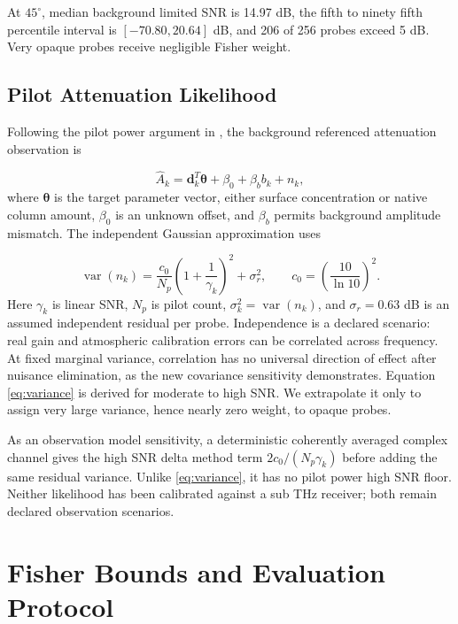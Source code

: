 \documentclass[conference]{IEEEtran}
\begin{document}
At $45^\circ$, median background limited SNR is 14.97 dB, the fifth to ninety fifth percentile interval is $[-70.80,20.64]$ dB, and 206 of 256 probes exceed 5 dB. Very opaque probes receive negligible Fisher weight.

\subsection{Pilot Attenuation Likelihood}

Following the pilot power argument in \cite{dong2026rain}, the background referenced attenuation observation is

\begin{equation}
\widehat{A}_k=\boldsymbol d_k^T\boldsymbol\theta
+\beta_0+\beta_b b_k+n_k,
\label{eq:observation}
\end{equation}
where $\boldsymbol\theta$ is the target parameter vector, either surface concentration or native column amount, $\beta_0$ is an unknown offset, and $\beta_b$ permits background amplitude mismatch. The independent Gaussian approximation uses

\begin{equation}
\operatorname{var}(n_k)=\frac{c_0}{N_p}
\left(1+\frac{1}{\gamma_k}\right)^2+\sigma_r^2,
\qquad c_0=\left(\frac{10}{\ln 10}\right)^2.
\label{eq:variance}
\end{equation}
Here $\gamma_k$ is linear SNR, $N_p$ is pilot count, $\sigma_k^2=\operatorname{var}(n_k)$, and $\sigma_r=0.63$ dB is an assumed independent residual per probe. Independence is a declared scenario: real gain and atmospheric calibration errors can be correlated across frequency. At fixed marginal variance, correlation has no universal direction of effect after nuisance elimination, as the new covariance sensitivity demonstrates. Equation \eqref{eq:variance} is derived for moderate to high SNR. We extrapolate it only to assign very large variance, hence nearly zero weight, to opaque probes.

As an observation model sensitivity, a deterministic coherently averaged complex channel gives the high SNR delta method term $2c_0/(N_p\gamma_k)$ before adding the same residual variance. Unlike \eqref{eq:variance}, it has no pilot power high SNR floor. Neither likelihood has been calibrated against a sub THz receiver; both remain declared observation scenarios.

\section{Fisher Bounds and Evaluation Protocol}
\end{document}
